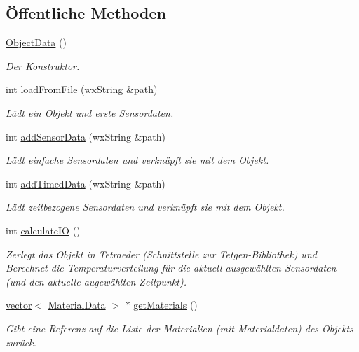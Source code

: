 \subsection*{Öffentliche Methoden}
\begin{DoxyCompactItemize}
\item 
\hyperlink{classObjectData_a1fd2e4bbefbdb93126f7f09f8e20f0ac}{Object\-Data} ()
\begin{DoxyCompactList}\small\item\em Der Konstruktor. \end{DoxyCompactList}\item 
int \hyperlink{classObjectData_ab2fabb02de2ac4b5ff09b73beb15223d}{load\-From\-File} (wx\-String \&path)
\begin{DoxyCompactList}\small\item\em Lädt ein Objekt und erste Sensordaten. \end{DoxyCompactList}\item 
int \hyperlink{classObjectData_a351c17608005c849cb0f26e44beee2ec}{add\-Sensor\-Data} (wx\-String \&path)
\begin{DoxyCompactList}\small\item\em Lädt einfache Sensordaten und verknüpft sie mit dem Objekt. \end{DoxyCompactList}\item 
int \hyperlink{classObjectData_ac8056d23b0882a826b6e572ff080688f}{add\-Timed\-Data} (wx\-String \&path)
\begin{DoxyCompactList}\small\item\em Lädt zeitbezogene Sensordaten und verknüpft sie mit dem Objekt. \end{DoxyCompactList}\item 
int \hyperlink{classObjectData_af3a850833d08eb9b45357449f455e24d}{calculate\-I\-O} ()
\begin{DoxyCompactList}\small\item\em Zerlegt das Objekt in Tetraeder (Schnittstelle zur Tetgen-\/\-Bibliothek) und Berechnet die Temperaturverteilung für die aktuell ausgewählten Sensordaten (und den aktuelle augewählten Zeitpunkt). \end{DoxyCompactList}\item 
\hyperlink{classstd_1_1vector}{vector}$<$ \hyperlink{structObjectData_1_1MaterialData}{Material\-Data} $>$ $\ast$ \hyperlink{classObjectData_afda67d7524b83780e431dd3a9c5ac23a}{get\-Materials} ()
\begin{DoxyCompactList}\small\item\em Gibt eine Referenz auf die Liste der Materialien (mit Materialdaten) des Objekts zurück. \end{DoxyCompactList}\item 

\end{DoxyCompactItemize}
